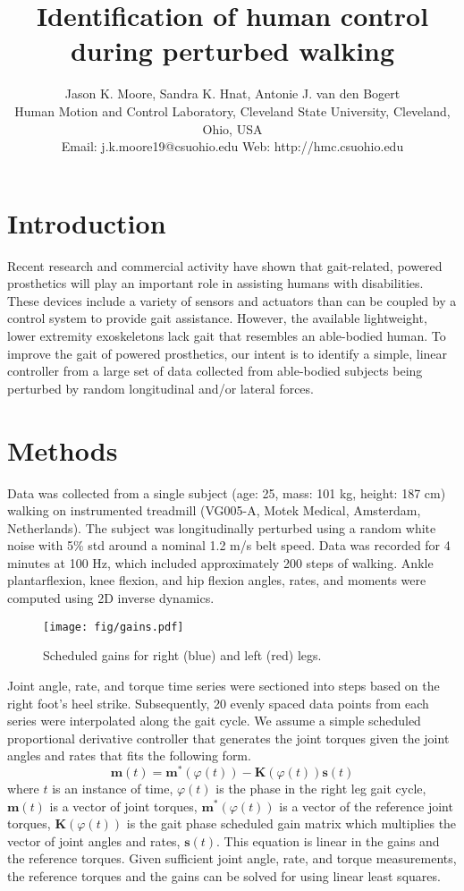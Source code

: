 \documentclass[10pt,letterpaper,notitlepage,twocolumn]{article}
\title{\bf Identification of human control during perturbed walking}
\author{
  Jason K. Moore, Sandra K. Hnat, Antonie J. van den Bogert\\
  Human Motion and Control Laboratory, Cleveland State University, Cleveland, Ohio, USA\\
  Email: j.k.moore19@csuohio.edu Web: http://hmc.csuohio.edu
}
\date{}
\begin{document}

\maketitle

\section*{Introduction}
%
Recent research and commercial activity have shown that gait-related, powered
prosthetics will play an important role in assisting humans with disabilities.
These devices include a variety of sensors and actuators than can be coupled by
a control system to provide gait assistance. However, the available lightweight, 
lower extremity exoskeletons lack gait that resembles an able-bodied human. To improve
the gait of powered prosthetics, our intent is to identify a simple, linear controller 
from a large set of data collected from able-bodied subjects being perturbed by random
longitudinal and/or lateral forces.
%
\section*{Methods}
Data was collected from a single subject (age: 25, mass: 101 kg, height: 187 cm)
walking on instrumented treadmill (VG005-A, Motek Medical, Amsterdam, Netherlands). 
The subject was longitudinally perturbed using a random white noise with 5\% std 
around a nominal 1.2 m/s belt speed. Data was recorded for 4 minutes at 100
Hz, which included approximately 200 steps of walking. Ankle plantarflexion, knee 
flexion, and hip flexion angles, rates, and moments were computed using 2D inverse
dynamics.
%
\begin{figure}[hbt]
  \begin{center}
    \texttt{[image: fig/gains.pdf]}
    \caption{Scheduled gains for right (blue) and left (red) legs.}
    \label{fig:gains}
  \end{center}
\end{figure}

Joint angle, rate, and torque time series were sectioned into steps based on
the right foot's heel strike.  Subsequently, 20 evenly spaced data points from
each series were interpolated along the gait cycle. We assume a simple scheduled 
proportional derivative controller that generates the joint torques given the joint
angles and rates that fits the following form.
%
\begin{equation}
  \mathbf{m}(t) = \mathbf{m}^*(\varphi(t)) -
  \mathbf{K}(\varphi(t))\mathbf{s}(t)
\end{equation}
%
where $t$ is an instance of time, $\varphi(t)$ is the phase in the right leg
gait cycle, $\mathbf{m}(t)$ is a vector of joint torques,
$\mathbf{m}^*(\varphi(t))$ is a vector of the reference joint torques,
$\mathbf{K}(\varphi(t))$ is the gait phase scheduled gain matrix which
multiplies the vector of joint angles and rates, $\mathbf{s}(t)$. This equation
is linear in the gains and the reference torques. Given sufficient joint angle,
rate, and torque measurements, the reference torques and the gains can be
solved for using linear least squares.
\end{document}
